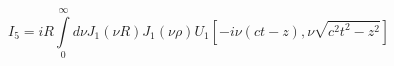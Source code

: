 \begin{equation}
I_5 = i R \int \limits_{0}^{\infty} d \nu J_1 \left( \nu R \right) 
J_1 \left( \nu \rho \right)
U_1 \left[ - i \nu \left( ct - z \right), \nu \sqrt{c^2t^2 - z^2} \right]
\end{equation}
%
